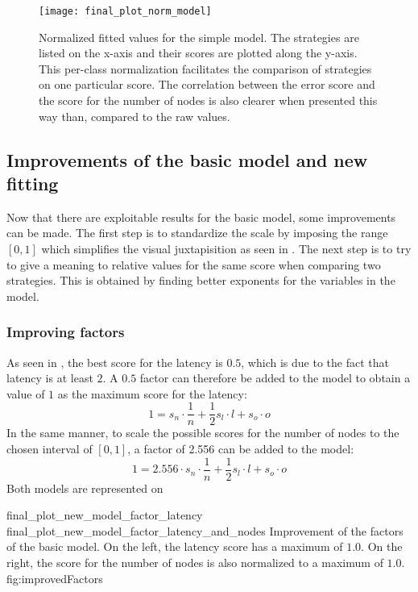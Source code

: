 \begin{figure}[h]
    \centering
    \texttt{[image: final\_plot\_norm\_model]}
    \caption{Normalized fitted values for the simple model. The strategies are listed
    on the x-axis and their scores are plotted along the y-axis. 
    This per-class normalization facilitates the comparison of strategies on one
    particular score.
    The correlation between the error score and the score for the number of
    nodes is also clearer when presented this way than, compared to the raw
    values.
    }
    \label{fig:recapTestsPlotNorm}
\end{figure}

\FloatBarrier
\subsection{Improvements of the basic model and new fitting}
\label{ssec:fittingImproved}
Now that there are exploitable results for the basic model, some improvements
can be made. The first step is to standardize the scale by imposing the range
\([0,1]\) which simplifies the visual juxtapisition as seen in
. The next step is to try to give a meaning to
relative values for the same score when comparing two strategies. This is
obtained by finding better exponents for the variables in the model.

\subsubsection{Improving factors}
As seen in , the best score for
the latency is \(0.5\), which is due to the fact that latency is at least \(2\).
A \(0.5\) factor can therefore be added to the model to obtain a value of \(1\)
as the maximum score for the latency:
\[1 = s_n \cdot \frac{1}{n} + \frac{1}{2} s_l\cdot l + s_o\cdot o\]
In the same manner, to scale the possible scores for the number of nodes to the
chosen interval of \([0,1]\), a factor of 2.556 can be added to the model:
\[1 = 2.556\cdot s_n \cdot \frac{1}{n} + \frac{1}{2} s_l\cdot l + s_o\cdot o\]
Both models are represented on 

\doublefigure
    {final_plot_new_model_factor_latency}
    {final_plot_new_model_factor_latency_and_nodes}
    {Improvement of the factors of the basic model. On the left, the latency
    score has a maximum of \(1.0\). On the right, the score for the number of nodes
    is also normalized to a maximum of \(1.0\).
    }
    {fig:improvedFactors}


